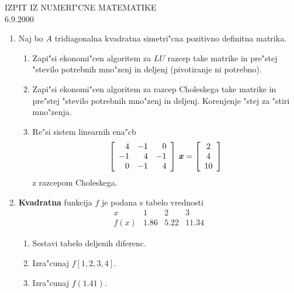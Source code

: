 

  \begin{center}
    {\Large IZPIT IZ NUMERI"CNE MATEMATIKE}\\
    6.9.2000
  \end{center}
\begin{enumerate}

  \item Naj bo $A$ tridiagonalna kvadratna simetri"cna pozitivno definitna 
  matrika.   

    \begin{enumerate}
       
    \item Zapi"si ekonomi"cen algoritem za $LU$ razcep take matrike
      in pre"stej "stevilo potrebnih mno"zenj in deljenj (pivotiranje ni 
      potrebno).
    \item Zapi"si ekonomi"cen algoritem za razcep Choleskega take matrike
      in pre"stej "stevilo potrebnih mno"zenj in deljenj. Korenjenje "stej
      za "stiri mno"zenja.
    \item Re"si sistem linearnih ena"cb 
      \begin{displaymath}
        \left[
        \begin{array}{rrr}
          4&-1&0\\
          -1&4&-1\\
          0&-1&4
        \end{array}
        \right]\,\mbox{\boldmath{$x$}}=
        \left[
        \begin{array}{c}
          2\\ 4\\ 10
        \end{array}
        \right]
      \end{displaymath}
    z razcepom Choleskega. 
    
    \end{enumerate}

  \item \textbf{Kvadratna} funkcija $f$ je podana s tabelo vrednosti
    \begin{displaymath}
      \begin{array}{c|ccc}
        x&1&2&3\\
        \hline
        f(x)&1.86&5.22&11.34
      \end{array}
    \end{displaymath}
        
    \begin{enumerate}
    
    \item Sestavi tabelo deljenih diferenc.

    \item Izra"cunaj $f[1,2,3,4]$.     
           
    \item Izra"cunaj $f(1.41)$.
          

    \end{enumerate}

\end{enumerate}

         